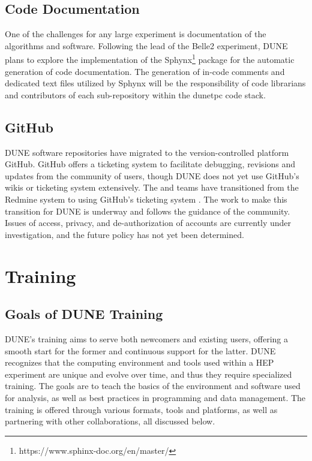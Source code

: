 \documentclass[../main-v1.tex]{subfiles}
\begin{document}
\subsection{Code Documentation}
One of the challenges for any large experiment is documentation of the algorithms and software. Following the lead of the Belle2 experiment, DUNE plans to explore the implementation of the Sphynx\footnote{https://www.sphinx-doc.org/en/master/} package for the automatic generation of code documentation. The generation of in-code comments and dedicated text files utilized by Sphynx will be the responsibility of code librarians and contributors of each sub-repository within the dunetpc code stack.


\subsection{GitHub}
DUNE software repositories have migrated to the version-controlled platform GitHub.  GitHub offers a ticketing system to facilitate debugging, revisions and updates from the community of users, though DUNE does not yet use GitHub's wikis or ticketing system extensively.  The  and  teams have transitioned from the Redmine system to using GitHub's ticketing system .  The work to make this transition for DUNE is underway and follows the guidance of the  community. Issues of access, privacy, and de-authorization of accounts are currently under investigation, and the future policy has not yet been determined. %


\section{Training }


\subsection{Goals of DUNE Training}
DUNE’s training aims to serve both newcomers and existing users, offering a smooth start for the former and continuous support for the latter. DUNE recognizes that the computing environment and tools used within a HEP experiment are unique and evolve over time, and thus they require specialized training. The goals are to teach the basics of the environment and software used for analysis, as well as best practices in programming and data management. The training is offered through various formats, tools and platforms, as well as partnering with other collaborations, all discussed below. 
\end{document}

